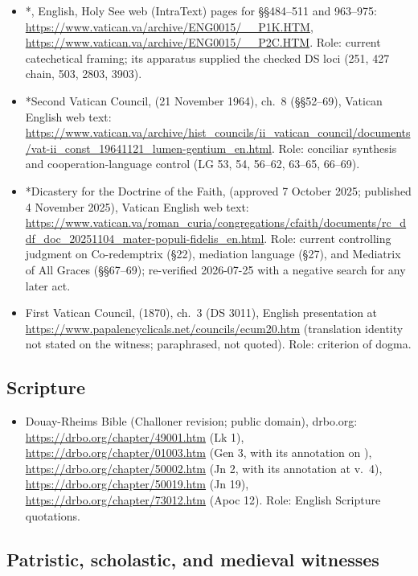 \begin{itemize}
\item *, English, Holy See web
(IntraText) pages for \S\S484--511 and 963--975:
\url{https://www.vatican.va/archive/ENG0015/__P1K.HTM},
\url{https://www.vatican.va/archive/ENG0015/__P2C.HTM}. Role: current
catechetical framing; its apparatus supplied the checked DS loci (251,
427 chain, 503, 2803, 3903).
\item *Second Vatican Council,  (21 November 1964),
ch.~8 (\S\S52--69), Vatican English web text:
\url{https://www.vatican.va/archive/hist_councils/ii_vatican_council/documents/vat-ii_const_19641121_lumen-gentium_en.html}.
Role: conciliar synthesis and cooperation-language control (LG 53, 54,
56--62, 63--65, 66--69).
\item *Dicastery for the Doctrine of the Faith,  (approved 7 October 2025; published 4 November 2025), Vatican
English web text:
\url{https://www.vatican.va/roman_curia/congregations/cfaith/documents/rc_ddf_doc_20251104_mater-populi-fidelis_en.html}.
Role: current controlling judgment on Co-redemptrix (\S22), mediation
language (\S27), and Mediatrix of All Graces (\S\S67--69); re-verified
2026-07-25 with a negative search for any later act.
\item First Vatican Council,  (1870), ch.~3 (DS 3011),
English presentation at
\url{https://www.papalencyclicals.net/councils/ecum20.htm} (translation
identity not stated on the witness; paraphrased, not quoted). Role:
criterion of dogma.
\end{itemize}

\subsection*{Scripture}

\begin{itemize}
\item Douay-Rheims Bible (Challoner revision; public domain), drbo.org:
\url{https://drbo.org/chapter/49001.htm} (Lk 1),
\url{https://drbo.org/chapter/01003.htm} (Gen 3, with its annotation on
), \url{https://drbo.org/chapter/50002.htm} (Jn 2,
with its annotation at v.~4), \url{https://drbo.org/chapter/50019.htm}
(Jn 19), \url{https://drbo.org/chapter/73012.htm} (Apoc 12). Role:
English Scripture quotations.
\end{itemize}

\subsection*{Patristic, scholastic, and medieval witnesses}

